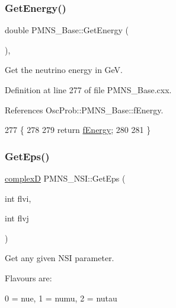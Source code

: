 \subsubsection{\texorpdfstring{Get\+Energy()}{GetEnergy()}}
{\footnotesize\ttfamily double P\+M\+N\+S\+\_\+\+Base\+::\+Get\+Energy (\begin{DoxyParamCaption}{ }\end{DoxyParamCaption})\hspace{0.3cm}{\ttfamily [virtual]}, {\ttfamily [inherited]}}

Get the neutrino energy in GeV. 

Definition at line 277 of file P\+M\+N\+S\+\_\+\+Base.\+cxx.



References Osc\+Prob\+::\+P\+M\+N\+S\+\_\+\+Base\+::f\+Energy.


\begin{DoxyCode}
277                             \{
278 
279   \textcolor{keywordflow}{return} \hyperlink{classOscProb_1_1PMNS__Base_a2800af6d436972f3e900867790c046b0}{fEnergy};
280 
281 \}
\end{DoxyCode}
\mbox{\label{classOscProb_1_1PMNS__NSI_a70f1c7d3d0dea3abf8ac40f856fc18ab}} 
\subsubsection{\texorpdfstring{Get\+Eps()}{GetEps()}}
{\footnotesize\ttfamily \hyperlink{EigenPoint_8h_a67ca8e107e20610c3fff78d5e726ece0}{complexD} P\+M\+N\+S\+\_\+\+N\+S\+I\+::\+Get\+Eps (\begin{DoxyParamCaption}\item[{int}]{flvi,  }\item[{int}]{flvj }\end{DoxyParamCaption})\hspace{0.3cm}{\ttfamily [virtual]}}

Get any given N\+SI parameter.

Flavours are\+:~\newline

\begin{DoxyItemize}
\item 0 = nue, 1 = numu, 2 = nutau
\end{DoxyItemize}

